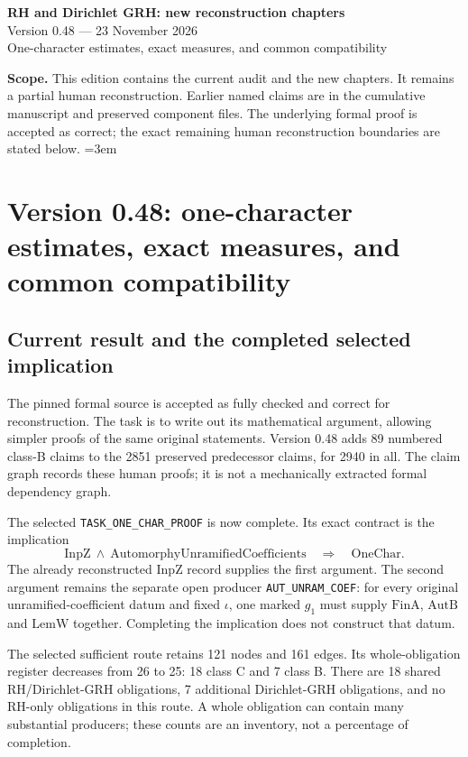 \documentclass[11pt,a4paper]{article}
\numberwithin{equation}{section}
\theoremstyle{remark}\newtheorem{remark}[theorem]{Remark}
\begin{document}
\begin{center}
{\LARGE\bfseries RH and Dirichlet GRH: new reconstruction chapters}\\[7pt]
{\large Version 0.48 --- 23 November 2026}\\[5pt]
{\large One-character estimates, exact measures, and common compatibility}
\end{center}
\textbf{Scope.} This edition contains the current audit and the new
chapters. It remains a partial human reconstruction. Earlier named
claims are in the cumulative manuscript and preserved component files.
The underlying formal proof is accepted as correct; the exact remaining
human reconstruction boundaries are stated below.
\setcounter{tocdepth}{1}
\tableofcontents
\clearpage
\begingroup\emergencystretch=3em
\section{Version 0.48: one-character estimates, exact measures, and common compatibility}
\label{sec:dependency-audit-v48}

\subsection{Current result and the completed selected implication}

The pinned formal source is accepted as fully checked and correct for
reconstruction. The task is to write out its mathematical argument,
allowing simpler proofs of the same original statements. Version 0.48
adds 89 numbered class-B claims to the 2851 preserved predecessor
claims, for 2940 in all. The claim graph records these human proofs;
it is not a mechanically extracted formal dependency graph.

The selected \texttt{TASK\_\allowbreak ONE\_\allowbreak CHAR\_\allowbreak PROOF} is now complete.
Its exact contract is the implication
\[
 \mathrm{InpZ}\ \wedge\
 \mathrm{AutomorphyUnramifiedCoefficients}
 \quad\Longrightarrow\quad\mathrm{OneChar}.
\]
The already reconstructed \(\mathrm{InpZ}\) record supplies the first
argument. The second argument remains the separate open producer
\texttt{AUT\_\allowbreak UNRAM\_\allowbreak COEF}: for every original unramified-coefficient
datum and fixed \(\iota\), one marked \(g_1\) must supply
\(\mathrm{FinA}\), \(\mathrm{AutB}\) and \(\mathrm{LemW}\)
together. Completing the implication does not construct that datum.

The selected sufficient route retains 121 nodes and 161 edges.
Its whole-obligation register decreases from 26 to 25:
18 class C and 7 class B. There are 18 shared RH/Dirichlet-GRH
obligations, 7 additional Dirichlet-GRH obligations, and no
RH-only obligations in this route. A whole obligation can contain
many substantial producers; these counts are an inventory, not a
percentage of completion.
\end{document}
